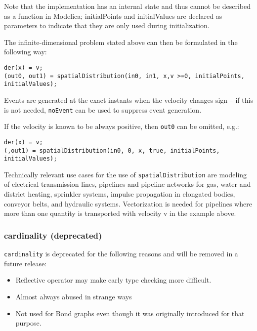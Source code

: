 \begin{nonnormative}
Note that the implementation has an internal state and thus
cannot be described as a function in Modelica; initialPoints and
initialValues are declared as parameters to indicate that they are only
used during initialization.

The infinite-dimensional problem stated above can then be formulated in the following way:
\begin{lstlisting}[language=modelica]
der(x) = v;
(out0, out1) = spatialDistribution(in0, in1, x,v >=0, initialPoints, initialValues);
\end{lstlisting}

Events are generated at the exact instants when the velocity
changes sign -- if this is not needed, \lstinline!noEvent! can be used to
suppress event generation.

If the velocity is known to be always positive, then \lstinline!out0! can be omitted, e.g.:
\begin{lstlisting}[language=modelica]
der(x) = v;
(,out1) = spatialDistribution(in0, 0, x, true, initialPoints, initialValues);
\end{lstlisting}
Technically relevant use cases for the use of
\lstinline!spatialDistribution! are modeling of electrical
transmission lines, pipelines and pipeline networks for gas, water and
district heating, sprinkler systems, impulse propagation in elongated
bodies, conveyor belts, and hydraulic systems. Vectorization is needed
for pipelines where more than one quantity is transported with velocity
v in the example above.
\end{nonnormative}

\subsubsection{cardinality (deprecated)}\label{cardinality-deprecated}

\begin{nonnormative}
\lstinline!cardinality! is deprecated for the following reasons and will be removed in a future release:
\begin{itemize}
\item
  Reflective operator may make early type checking more difficult.
\item
  Almost always abused in strange ways
\item
  Not used for Bond graphs even though it was originally introduced for that purpose.
\end{itemize}
\end{nonnormative}

